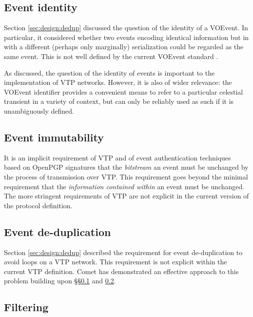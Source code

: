 \documentclass[5p,authoryear]{elsarticle}
\begin{document}
\subsection{Event identity}
\label{sec:future:identity}

Section \ref{sec:design:dedup} discussed the question of the identity of a
VOEvent. In particular, it considered whether two events encoding identical
information but in with a different (perhaps only marginally) serialization
could be regarded as the same event. This is not well defined by the current
VOEvent standard \citep{Seaman:2011}.

As discussed, the question of the identity of events is important to the
implementation of VTP networks. However, it is also of wider relevance: the
VOEvent identifier provides a convenient means to refer to a particular
celestial transient in a variety of context, but can only be reliably used as
such if it is unambiguously defined.

\subsection{Event immutability}
\label{sec:future:immutability}

It is an implicit requirement of VTP and of event authentication techniques
based on OpenPGP signatures that the \textit{bitstream} an event must be
unchanged by the process of transmission over VTP. This requirement goes
beyond the minimal requirement that the \textit{information contained within}
an event must be unchanged. The more stringent requirements of VTP are not
explicit in the current version of the protocol definition.

\subsection{Event de-duplication}
\label{sec:future:dedup}

Section \ref{sec:design:dedup} described the requirement for event
de-duplication to avoid loops on a VTP network. This requirement is not
explicit within the current VTP definition. Comet has demonstrated an
effective approach to this problem building upon \S\S\ref{sec:future:identity}
and \ref{sec:future:immutability}.

\subsection{Filtering}
\label{sec:future:filter}
\end{document}
